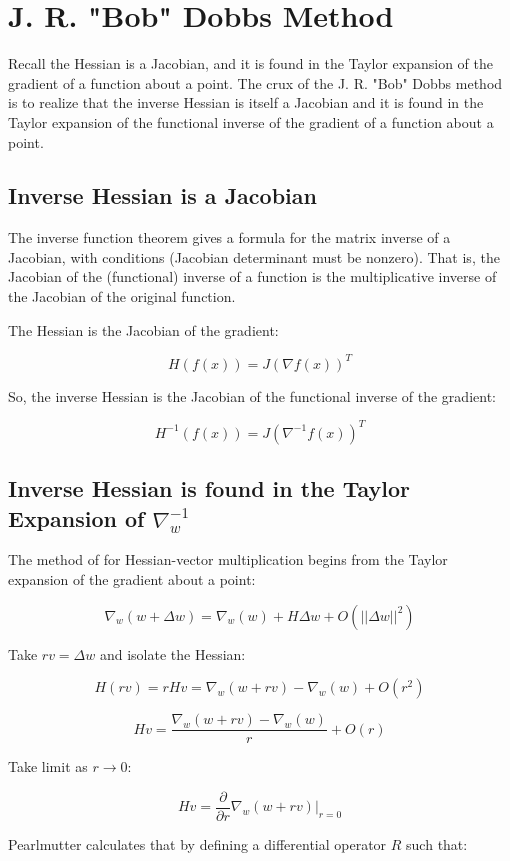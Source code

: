 \documentclass{article}
\begin{document}
\section{J. R. "Bob" Dobbs Method}

Recall the Hessian is a Jacobian, and it is found in the Taylor expansion of the gradient of a function about a point. The crux of the J. R. "Bob" Dobbs method is to realize that the inverse Hessian is itself a Jacobian and it is found in the Taylor expansion of the functional inverse of the gradient of a function about a point.

\subsection{Inverse Hessian is a Jacobian}

The inverse function theorem \cite{lang1995} gives a formula for the matrix inverse of a Jacobian, with conditions (Jacobian determinant must be nonzero). That is, the Jacobian of the (functional) inverse of a function is the multiplicative inverse of the Jacobian of the original function.

The Hessian is the Jacobian of the gradient:

$$H(f(x)) = J(\nabla f(x))^T $$

So, the inverse Hessian is the Jacobian of the functional inverse of the gradient:

$$H^{-1}(f(x)) = J(\nabla^{-1} f(x))^T $$

\subsection{Inverse Hessian is found in the Taylor Expansion of $\nabla_w^{-1}$}

The method of \cite{pearlmutter1994} for Hessian-vector multiplication begins from the Taylor expansion of the gradient about a point:

$$\nabla_w (w + \Delta w) = \nabla_w (w) + H\Delta w + O(||\Delta w||^2)$$

Take $rv = \Delta w$ and isolate the Hessian:

$$H(rv) = rHv = \nabla_w(w + rv) - \nabla_w(w) + O(r^2)$$

$$Hv = \frac{\nabla_w(w + rv) - \nabla_w(w)}{r} + O(r)$$

Take limit as $r \rightarrow 0$:

$$Hv = \frac{\partial}{\partial r} \nabla_w (w + rv) |_{r=0}$$

Pearlmutter calculates that by defining a differential operator $R$ such that:
\end{document}
